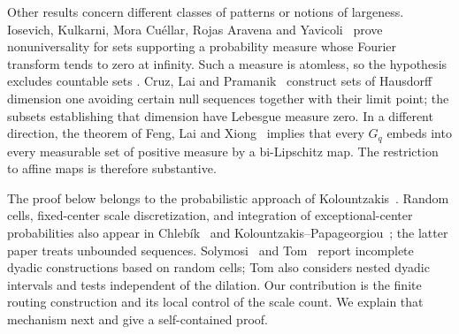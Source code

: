 Other results concern different classes of patterns or notions of
largeness. Iosevich, Kulkarni, Mora Cu\'ellar, Rojas Aravena and
Yavicoli~\cite[Theorem~1.5]{IKMRY2026Rajchman} prove nonuniversality
for sets supporting a probability measure whose Fourier transform
tends to zero at infinity. Such a measure is atomless, so the
hypothesis excludes countable sets
\cite[Proposition~4.1]{IKMRY2026Rajchman}.
Cruz, Lai and Pramanik~\cite[preprint, Corollary~1.2 and
Proposition~4.4]{CruzLaiPramanik2023} construct sets of Hausdorff
dimension one avoiding certain null sequences together with their
limit point; the subsets establishing that dimension have Lebesgue
measure zero. In a different direction, the theorem of Feng, Lai and
Xiong~\cite[preprint, Theorem~1.1]{FengLaiXiong2024} implies that
every $G_q$ embeds into every measurable set of positive measure by
a bi-Lipschitz map. The restriction to affine maps is therefore
substantive.

The proof below belongs to the probabilistic approach of
Kolountzakis~\cite{Kolountzakis1997}. Random cells, fixed-center
scale discretization, and integration of exceptional-center
probabilities also appear in Chleb\'ik~\cite[Section~5]{Chlebik2015}
and Kolountzakis--Papageorgiou~\cite[Section~3.1]{KolountzakisPapageorgiou2025};
the latter paper treats unbounded sequences. Solymosi~\cite[Section~3]{Solymosi2011Sparse}
and Tom~\cite{Tom2015} report incomplete dyadic constructions based on
random cells; Tom also considers nested dyadic intervals and tests
independent of the dilation. Our contribution is the
finite routing construction and its local control of the scale
count. We explain that mechanism next and give a self-contained proof.
